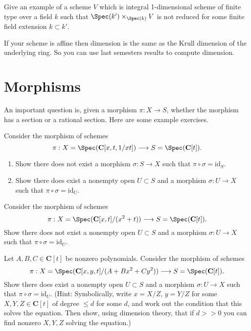 \begin{exercise}
\label{exercise-not-geometrically-reduced}
Give an example of a scheme
$V$ which is integral 1-dimensional scheme of finite type
over a field $k$ such that $\Spec(k') \times_{\Spec(k)} V$
is not reduced for some finite field extension $k \subset k'$.
\end{exercise}

\begin{remark}
\label{remark-affine-dimension}
If your scheme is affine then dimension is the
same as the Krull dimension of the underlying ring. So you can
use last semesters results to compute dimension.
\end{remark}






\section{Morphisms}
\label{section-morphisms}

\noindent
An important question is, given a morphism $\pi : X \to S$,
whether the morphism has a section or a rational section.
Here are some example exercises.

\begin{exercise}
\label{exercise-no-section}
Consider the morphism of schemes
$$
\pi :
X = \Spec(\mathbf{C}[x, t, 1/xt])
\longrightarrow
S = \Spec(\mathbf{C}[t]).
$$
\begin{enumerate}
\item Show there does not exist a morphism $\sigma : S \to X$
such that $\pi \circ \sigma = \text{id}_S$.
\item Show there does exist a nonempty open $U \subset S$ and
a morphism $\sigma : U \to X$ such that $\pi \circ \sigma = \text{id}_U$.
\end{enumerate}
\end{exercise}

\begin{exercise}
\label{exercise-no-rational-section}
Consider the morphism of schemes
$$
\pi :
X = \Spec(\mathbf{C}[x, t]/(x^2 + t))
\longrightarrow
S = \Spec(\mathbf{C}[t]).
$$
Show there does not exist a nonempty open $U \subset S$ and
a morphism $\sigma : U \to X$ such that $\pi \circ \sigma = \text{id}_U$.
\end{exercise}

\begin{exercise}
\label{exercise-has-rational-section}
Let $A, B, C \in \mathbf{C}[t]$ be nonzero polynomials.
Consider the morphism of schemes
$$
\pi :
X = \Spec(\mathbf{C}[x, y, t]/(A + Bx^2 + Cy^2))
\longrightarrow
S = \Spec(\mathbf{C}[t]).
$$
Show there does exist a nonempty open $U \subset S$ and
a morphism $\sigma : U \to X$ such that $\pi \circ \sigma = \text{id}_U$.
(Hint: Symbolically, write $x = X/Z$, $y = Y/Z$ for some
$X, Y, Z \in \mathbf{C}[t]$ of degree $\leq d$ for some $d$,
and work out the condition that this solves the equation.
Then show, using dimension theory, that if $d >> 0$ you can find
nonzero $X, Y, Z$ solving the equation.)
\end{exercise}

